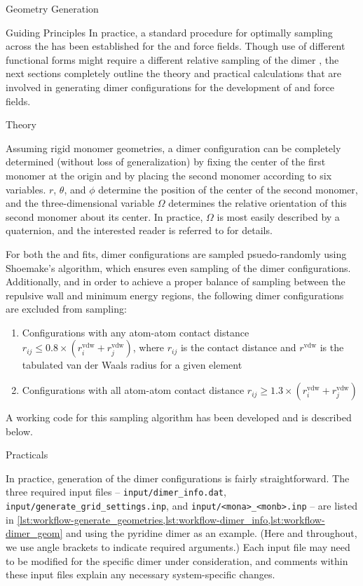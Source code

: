 \begin{section}{Geometry Generation}
\begin{subsection}{Guiding Principles}
In practice, a standard procedure for optimally sampling across the
\pes has been established for the \isaffold
and \mastiff force fields. Though use of different functional forms might
require a different relative sampling of the dimer \pes, the next sections completely outline the
theory and practical calculations that are involved in generating dimer
configurations for the development of \isaffold and \mastiff force fields.

\end{subsection}
\begin{subsection}{Theory}

Assuming rigid monomer geometries, a dimer configuration can be completely
determined (without loss of generalization) by fixing the center of the first monomer at the
origin and by placing the second monomer according to six variables. $r$, $\theta$, and $\phi$ determine the position
of the center of the second monomer, and the three-dimensional variable $\Omega$ determines the relative
orientation of this second monomer about its center. In practice, $\Omega$ is
most easily described by a quaternion, and the interested reader is referred
to  for details.

For both the \isaffold and \mastiff fits, dimer configurations are sampled
psuedo-randomly using Shoemake's algorithm,\cite{Shoemake1992} which ensures
even sampling of the dimer configurations. Additionally, and
in order to achieve a proper balance of sampling between the
repulsive wall and minimum energy regions, the following dimer configurations
are excluded from sampling:
\begin{enumerate}
\item Configurations with any atom-atom contact distance 
$r_{ij} \le 0.8\times(r^{\text{vdw}}_i + r^{\text{vdw}}_j)$, where $r_{ij}$ is the
contact distance and $r^{\text{vdw}}$ is the tabulated van der Waals radius
for a given element
\item Configurations with all atom-atom contact distance 
$r_{ij} \ge 1.3\times(r^{\text{vdw}}_i + r^{\text{vdw}}_j)$
\end{enumerate}
A working code for this sampling algorithm has been developed and is described
below.


\end{subsection}
\begin{subsection}{Practicals}

In practice, generation of the dimer configurations is fairly straightforward.
The three required input files -- \verb|input/dimer_info.dat|,
\verb|input/generate_grid_settings.inp|, and \verb|input/<mona>_<monb>.inp| --
are
listed  in
\cref{lst:workflow-generate_geometries,lst:workflow-dimer_info,lst:workflow-dimer_geom}
and using the pyridine dimer as an example.
(Here and throughout, we use angle brackets to indicate required arguments.)
Each input file may need to be modified for the specific dimer under consideration, and
comments within these input files explain any necessary system-specific changes.


\end{subsection}
\end{section}

